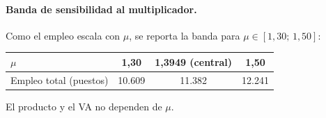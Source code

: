 \documentclass[11pt]{article}
\begin{document}
\paragraph{Banda de sensibilidad al multiplicador.} Como el empleo escala con $\mu$, se reporta la banda para $\mu\in[1{,}30;\,1{,}50]$:
\begin{center}\small
\begin{tabular}{lccc}
\toprule
$\mu$ & 1{,}30 & 1{,}3949 (central) & 1{,}50 \\
\midrule
Empleo total (puestos) & 10.609 & 11.382 & 12.241 \\
\bottomrule
\end{tabular}
\end{center}
El producto y el VA no dependen de $\mu$.


\appendix
\end{document}
